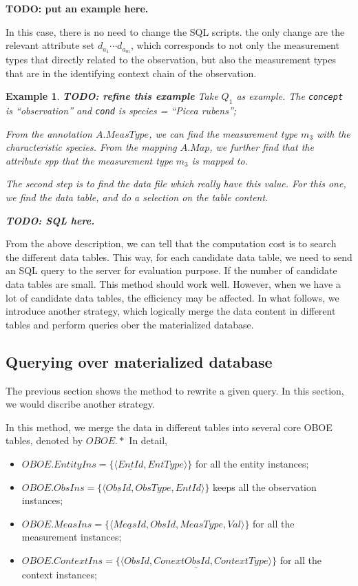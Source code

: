 \documentclass[conference]{IEEEtran}
\newtheorem{example}{Example}[section]
\begin{document}
{\bf TODO: put an example here.}

In this case, there is no need to change the SQL scripts.
the only change are the relevant attribute set $d_{a_1} \cdots
d_{a_m}$, which corresponds to not only the measurement types that
directly related to the observation, but also the measurement types
that are in the identifying context chain of the observation. 

\begin{example}\label{eg:query_reqerite_q1}
{\bf TODO: refine this example} 
Take $Q_1$ as example. The {\tt concept} is ``observation'' and {\tt cond} is {\em species = ``Picea rubens''}; 

From the annotation $A.MeasType$, we can find the measurement type
$m_3$ with the characteristic {\em species}. 
From the mapping $A.Map$, we further find that the attribute {\em spp} that the
measurement type $m_3$ is mapped to. 

The second step is to find the data file which really have this value. 
For this one, we find the data table, and do a selection on the table
content. 

{\bf TODO: SQL here.} 
\end{example}

From the above description, we can tell that the computation cost is to search the different data
tables. This way, for each candidate data table, we need to send an
SQL query to the server for evaluation purpose.
If the number of candidate data tables are small. This method should
work well. However, when we have a lot of candidate data tables, the
efficiency may be affected. 
In what follows, we introduce another strategy, which logically merge
the data content in different tables and perform queries ober the
materialized database. 

\subsection{Querying over materialized database}\label{sec:matdb}

The previous section shows the method to rewrite a given query. 
In this section, we would discribe another strategy. 

In this method, we merge the data in different tables into several
core OBOE tables, denoted by $OBOE.*$
In detail,
\begin{itemize}
\item $OBOE.EntityIns=\{\langle \underline{EntId}, EntType\rangle\}$ for all the entity instances;
\item $OBOE.ObsIns=\{\langle \underline{ObsId}, ObsType, EntId \rangle\}$ keeps all the observation instances;
\item $OBOE.MeasIns=\{\langle \underline{MeasId}, ObsId, MeasType, Val\rangle\}$ for all the measurement instances;
\item $OBOE.ContextIns =\{\langle \underline{ObsId, ConextObsId, ContextType}\rangle\}$ for all the context instances;
\end{itemize}
\end{document}
